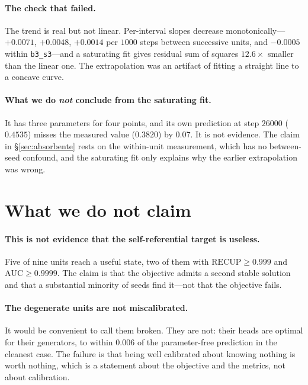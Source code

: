 \documentclass[11pt,a4paper]{article}
\begin{document}
\paragraph{The check that failed.} The trend is real but not linear. Per-interval slopes decrease
monotonically---$+0.0071$, $+0.0048$, $+0.0014$ per $1000$ steps between successive units, and
$-0.0005$ within \texttt{b3\_s3}---and a saturating fit gives residual sum of squares $12.6\times$
smaller than the linear one. The extrapolation was an artifact of fitting a straight line to a
concave curve.

\paragraph{What we do \emph{not} conclude from the saturating fit.} It has three parameters for four
points, and its own prediction at step $26000$ ($0.4535$) misses the measured value ($0.3820$) by
$0.07$. It is not evidence. The claim in \S\ref{sec:absorbente} rests on the within-unit measurement,
which has no between-seed confound, and the saturating fit only explains why the earlier
extrapolation was wrong.

\section{What we do not claim}
\label{sec:noclaim}

\paragraph{This is not evidence that the self-referential target is useless.} Five of nine units
reach a useful state, two of them with $\mathrm{RECUP} \geq 0.999$ and $\mathrm{AUC} \geq 0.9999$.
The claim is that the objective admits a second stable solution and that a substantial minority of
seeds find it---not that the objective fails.

\paragraph{The degenerate units are not miscalibrated.} It would be convenient to call them broken.
They are not: their heads are optimal for their generators, to within $0.006$ of the parameter-free
prediction in the cleanest case. The failure is that being well calibrated about knowing nothing is
worth nothing, which is a statement about the objective and the metrics, not about calibration.
\end{document}
